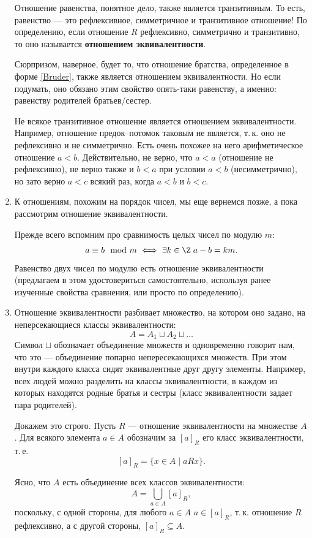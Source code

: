 \begin{enumerate}
Отношение равенства, понятное дело, также является транзитивным. То есть, равенство --- это рефлексивное, симметричное и транзитивное отношение! По определению, если отношение $R$ рефлексивно, симметрично и транзитивно, то оно называется \textbf{отношением эквивалентности}.

Сюрпризом, наверное, будет то, что отношение братства, определенное в форме \eqref{Bruder}, также является отношением эквивалентности. Но если подумать, оно обязано этим свойство опять-таки равенству, а именно: равенству родителей братьев/сестер.

Не всякое транзитивное отношение является отношением эквивалентности. Например, отношение предок--потомок таковым не является, т.\,к. оно не рефлексивно и не симметрично. Есть очень похожее на него арифметическое отношение $a<b$. Действительно, не верно, что $a<a$ (отношение не рефлексивно), не верно также и $b<a$ при условии $a<b$ (несимметрично), но зато верно $a<c$ всякий раз, когда $a<b$ и $b<c$.

\item К отношениям, похожим на порядок чисел, мы еще вернемся позже, а пока рассмотрим отношение эквивалентности.

Прежде всего вспомним про сравнимость целых чисел по модулю $m$:
$$
a\equiv b\mod m\iff \exists k\in\Z\;a-b=km.
$$
Равенство двух чисел по модулю есть отношение эквивалентности (предлагаем в этом удостовериться самостоятельно, используя ранее изученные свойства сравнения, или просто по определению).

\item Отношение эквивалентности разбивает множество, на котором оно задано, на неперсекающиеся классы эквивалентности:
$$
A = A_1\sqcup A_2\sqcup\dots
$$
Символ $\sqcup$ обозначает объединение множеств и одновременно говорит нам, что это --- объединение попарно непересекающихся множеств.
При этом внутри каждого класса сидят эквивалентные друг другу элементы. Например, всех людей можно разделить на классы эквивалентности, в каждом из которых находятся родные братья и сестры (класс эквивалентности задает пара родителей).

Докажем это строго. Пусть $R$ --- отношение эквивалентности на множестве $A$. Для всякого элемента $a\in A$ обозначим за $[a]_R$ его класс эквивалентности, т.\,е.
$$
[a]_R = \{x\in A\mid aRx\}.
$$

Ясно, что $A$ есть объединение всех классов эквивалентности:
$$
A=\bigcup_{a\in A}[a]_R,
$$
поскольку, с одной стороны, для любого $a\in A$ $a\in[a]_R$, т.\,к. отношение $R$ рефлексивно, а с другой стороны, $[a]_R\subseteq A$.


\end{enumerate}
